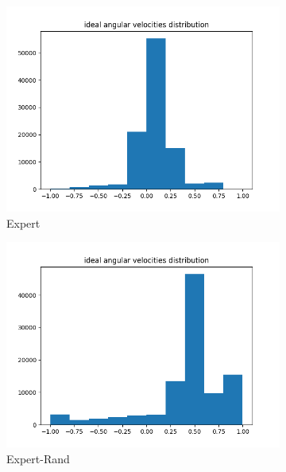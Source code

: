 \begin{figure}[H]
	\centering
	\begin{subfigure}[h]{0.4\textwidth}
		\centering
		\includegraphics[width=\linewidth]{kapitel5/images/eval/expert/expert-distr.png}
		\caption{\glqq Expert\grqq}
		\label{expert-drive-val-distr}
	\end{subfigure}%
	\begin{subfigure}[h]{0.4\textwidth}
		\centering
		\includegraphics[width=\linewidth]{kapitel5/images/eval/expert/expert-rand-distr.png}
		\caption{\glqq Expert-Rand\grqq}
		\label{expert-rand-val-distr}
	\end{subfigure}
	\begin{subfigure}[h]{0.4\textwidth}

\end{subfigure}
\end{figure}
